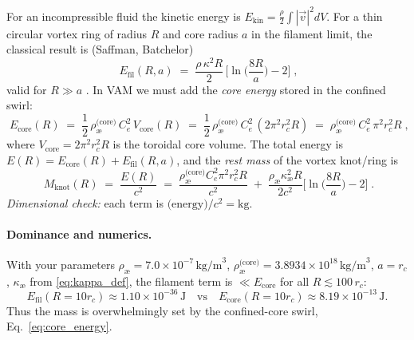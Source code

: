 \documentclass[a4paper,12pt]{article}
\begin{document}
    For an incompressible fluid the kinetic energy is $E_\text{kin}=\frac{\rho}{2}\int |\vec v|^2 dV$. For a thin circular vortex ring of radius $R$ and core radius $a$ in the filament limit, the classical result is (Saffman, Batchelor)
    \begin{equation}
        \boxed{\;E_\text{fil}(R,a)\;=\;\frac{\rho\,\kappa^2 R}{2}\,\Big[\ln\!\Big(\frac{8R}{a}\Big)-2\Big]\;}\!,
        \label{eq:saffman_energy}
    \end{equation}
    valid for $R\gg a$ \cite{Saffman1992,Batchelor1967}. In VAM we must add the \emph{core energy} stored in the confined swirl:
    \begin{equation}
        \boxed{\;E_\text{core}(R)\;=\;\frac{1}{2}\,\rho_\text{\ae}^{\text{(core)}}\,C_e^2\,V_\text{core}(R)
        \;=\;\frac{1}{2}\,\rho_\text{\ae}^{\text{(core)}}\,C_e^2\,(2\pi^2 r_c^2 R)\;=\;\rho_\text{\ae}^{\text{(core)}}\,C_e^2\,\pi^2 r_c^2 R\;}\!,
        \label{eq:core_energy}
    \end{equation}
    where $V_\text{core}=2\pi^2 r_c^2 R$ is the toroidal core volume. The total energy is $E(R)=E_\text{core}(R)+E_\text{fil}(R,a)$, and the \emph{rest mass} of the vortex knot/ring is
    \begin{equation}
        \boxed{\;M_\text{knot}(R)\;=\;\frac{E(R)}{c^2}\;=\;\frac{\rho_\text{\ae}^{\text{(core)}} C_e^2 \pi^2 r_c^2 R}{c^2}\;+\;\frac{\rho_\text{\ae}\kappa_\text{\ae}^2 R}{2c^2}\Big[\ln\!\Big(\frac{8R}{a}\Big)-2\Big]\;}\!.
        \label{eq:mass_total}
    \end{equation}
    \emph{Dimensional check:} each term is $\text{(energy)}/c^2=\text{kg}$.

    \paragraph{Dominance and numerics.}
    With your parameters $\rho_\text{\ae}=7.0\times 10^{-7}\,\text{kg/m}^3$, $\rho_\text{\ae}^{\text{(core)}}=3.8934\times 10^{18}\,\text{kg/m}^3$, $a=r_c$, $\kappa_\text{\ae}$ from \eqref{eq:kappa_def}, the filament term is $\ll E_\text{core}$ for all $R\lesssim 100\,r_c$:
    \[
        E_\text{fil}(R{=}10r_c)\approx 1.10\times 10^{-36}\,\text{J}\quad\text{vs}\quad
        E_\text{core}(R{=}10r_c)\approx 8.19\times 10^{-13}\,\text{J}.
    \]
    Thus the mass is overwhelmingly set by the confined-core swirl, Eq.~\eqref{eq:core_energy}.
\end{document}
